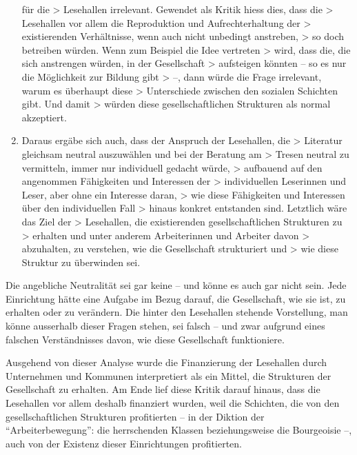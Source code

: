 \documentclass[a4paper,
fontsize=11pt,
oneside,
numbers=noperiodatend,
parskip=half-,
bibliography=totoc,
final
]{scrartcl}
\begin{document}
\begin{enumerate}
  für die \textgreater{} Lesehallen irrelevant. Gewendet als Kritik
  hiess dies, dass die \textgreater{} Lesehallen vor allem die
  Reproduktion und Aufrechterhaltung der \textgreater{} existierenden
  Verhältnisse, wenn auch nicht unbedingt anstreben, \textgreater{} so
  doch betreiben würden. Wenn zum Beispiel die Idee vertreten
  \textgreater{} wird, dass die, die sich anstrengen würden, in der
  Gesellschaft \textgreater{} aufsteigen könnten -- so es nur die
  Möglichkeit zur Bildung gibt \textgreater{} --, dann würde die Frage
  irrelevant, warum es überhaupt diese \textgreater{} Unterschiede
  zwischen den sozialen Schichten gibt. Und damit \textgreater{} würden
  diese gesellschaftlichen Strukturen als normal akzeptiert.
\item
  Daraus ergäbe sich auch, dass der Anspruch der Lesehallen, die
  \textgreater{} Literatur gleichsam neutral auszuwählen und bei der
  Beratung am \textgreater{} Tresen neutral zu vermitteln, immer nur
  individuell gedacht würde, \textgreater{} aufbauend auf den angenommen
  Fähigkeiten und Interessen der \textgreater{} individuellen Leserinnen
  und Leser, aber ohne ein Interesse daran, \textgreater{} wie diese
  Fähigkeiten und Interessen über den individuellen Fall \textgreater{}
  hinaus konkret entstanden sind. Letztlich wäre das Ziel der
  \textgreater{} Lesehallen, die existierenden gesellschaftlichen
  Strukturen zu \textgreater{} erhalten und unter anderem Arbeiterinnen
  und Arbeiter davon \textgreater{} abzuhalten, zu verstehen, wie die
  Gesellschaft strukturiert und \textgreater{} wie diese Struktur zu
  überwinden sei.
\end{enumerate}

Die angebliche Neutralität sei gar keine -- und könne es auch gar nicht
sein. Jede Einrichtung hätte eine Aufgabe im Bezug darauf, die
Gesellschaft, wie sie ist, zu erhalten oder zu verändern. Die hinter den
Lesehallen stehende Vorstellung, man könne ausserhalb dieser Fragen
stehen, sei falsch -- und zwar aufgrund eines falschen Verständnisses
davon, wie diese Gesellschaft funktioniere.

Ausgehend von dieser Analyse wurde die Finanzierung der Lesehallen durch
Unternehmen und Kommunen interpretiert als ein Mittel, die Strukturen
der Gesellschaft zu erhalten. Am Ende lief diese Kritik darauf hinaus,
dass die Lesehallen vor allem deshalb finanziert wurden, weil die
Schichten, die von den gesellschaftlichen Strukturen profitierten -- in
der Diktion der \enquote{Arbeiterbewegung}: die herrschenden Klassen
beziehungsweise die Bourgeoisie --, auch von der Existenz dieser
Einrichtungen profitierten.
\end{document}
